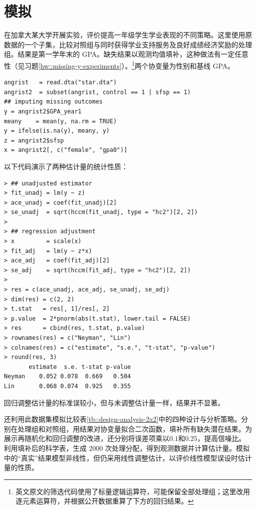  

\section{模拟}
\label{sec::rem-reg-simulation}

\citet{angrist2009incentives}在加拿大某大学开展实验，评价提高一年级学生学业表现的不同策略。这里使用原数据的一个子集，比较对照组与同时获得学业支持服务及良好成绩经济奖励的处理组。结果是第一学年末的 GPA。缺失结果以观测均值填补，这种做法有一定任意性（见习题\ref{hw::missing-y-experiments}）。\footnote{英文原文的筛选代码使用了标量逻辑运算符，可能保留全部处理组；这里改用逐元素运算符，并根据公开数据重算了下方的回归结果。}两个协变量为性别和基线 GPA。

\begin{lstlisting}
angrist   = read.dta("star.dta")
angrist2  = subset(angrist, control == 1 | sfsp == 1)
## imputing missing outcomes
y = angrist2$GPA_year1
meany    = mean(y, na.rm = TRUE)
y = ifelse(is.na(y), meany, y)
z = angrist2$sfsp 
x = angrist2[, c("female", "gpa0")]
\end{lstlisting}


以下代码演示了两种估计量的统计性质： 
\begin{lstlisting}
> ## unadjusted estimator
> fit_unadj = lm(y ~ z)
> ace_unadj = coef(fit_unadj)[2]
> se_unadj  = sqrt(hccm(fit_unadj, type = "hc2")[2, 2])
> 
> ## regression adjustment
> x         = scale(x)
> fit_adj   = lm(y ~ z*x)
> ace_adj   = coef(fit_adj)[2]
> se_adj    = sqrt(hccm(fit_adj, type = "hc2")[2, 2])
> 
> res = c(ace_unadj, ace_adj, se_unadj, se_adj)
> dim(res) = c(2, 2)
> t.stat   = res[, 1]/res[, 2]
> p.value  = 2*pnorm(abs(t.stat), lower.tail = FALSE) 
> res      = cbind(res, t.stat, p.value)
> rownames(res) = c("Neyman", "Lin")
> colnames(res) = c("estimate", "s.e.", "t-stat", "p-value")
> round(res, 3)
       estimate  s.e. t-stat p-value
Neyman    0.052 0.078  0.669   0.504
Lin       0.068 0.074  0.925   0.355
\end{lstlisting}
回归调整估计量的标准误较小，但与未调整估计量一样，结果并不显著。



还利用此数据集模拟比较表\ref{tb::design-analysis-2x2}中的四种设计与分析策略。分别在处理组和对照组，用结果对协变量拟合二次函数，填补所有缺失潜在结果。为展示再随机化和回归调整的改进，还分别将误差项乘以$0.1$和$0.25$，提高信噪比。利用填补后的科学表，生成 2000 次处理分配，得到观测数据并计算估计量。模拟中的“真实”结果模型非线性，但仍采用线性调整估计，以评价线性模型误设时估计量的性质。 


